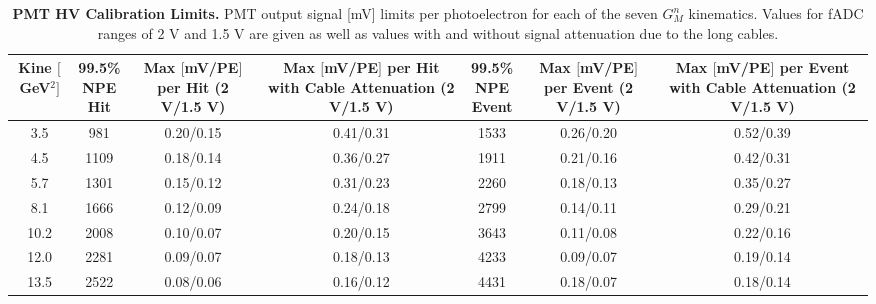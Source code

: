 \documentclass[10pt]{article}
\begin{document}
	\begin{table}[h]
	\centering
	\begin{tabular}{|c|cccccc|}
	\hline
	\makecell{Kine\\$[$GeV$^2]$} & \makecell{99.5\%\\NPE\\Hit} & \makecell{Max $[$mV/PE$]$\\per Hit\\(2 V/1.5 V)} & \makecell{Max $[$mV/PE$]$\\per Hit\\with Cable\\Attenuation\\(2 V/1.5 V)} & \makecell{99.5\%\\NPE\\Event} & \makecell{Max $[$mV/PE$]$\\per Event\\(2 V/1.5 V)} & \makecell{Max $[$mV/PE$]$\\per Event\\with Cable\\Attenuation\\(2 V/1.5 V)}\\
	\hline
	3.5 & 981 & 0.20/0.15 & 0.41/0.31 & 1533 & 0.26/0.20 & 0.52/0.39\\
    4.5 & 1109 & 0.18/0.14 & 0.36/0.27 & 1911 & 0.21/0.16 & 0.42/0.31\\
    5.7 & 1301 & 0.15/0.12 & 0.31/0.23 & 2260 & 0.18/0.13 & 0.35/0.27\\
    8.1 & 1666 & 0.12/0.09 & 0.24/0.18 & 2799 & 0.14/0.11 & 0.29/0.21\\
    10.2 & 2008 & 0.10/0.07 & 0.20/0.15 & 3643 & 0.11/0.08 & 0.22/0.16\\
    12.0 & 2281 & 0.09/0.07 & 0.18/0.13 & 4233 & 0.09/0.07 & 0.19/0.14\\
    13.5 & 2522 & 0.08/0.06 & 0.16/0.12 & 4431 & 0.18/0.07 & 0.18/0.14\\
	\hline
	\end{tabular}
	\caption{{\bf{PMT HV Calibration Limits.}} PMT output signal [mV] limits per photoelectron for each of the seven $G_M^n$ kinematics. Values for fADC ranges of 2 V and 1.5 V are given as well as values with and without signal attenuation due to the long cables.} %
	\label{tab:max_outputs}
	\end{table}
	
\end{document}
